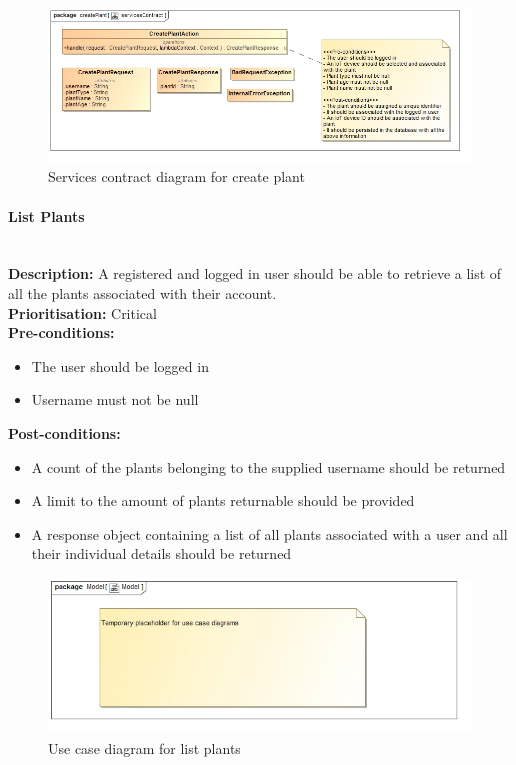 \documentclass{article}
\begin{document}
		\begin{figure}[H]
			\includegraphics[width=\linewidth]{images/ServicesContracts/createPlant.jpg}
			\caption{Services contract diagram for create plant}
		\end{figure}
		
	\paragraph{List Plants}\mbox{}\\
		\textbf{Description:} A registered and logged in user should be able to retrieve a list of all the plants associated with their account.\\
		\textbf{Prioritisation:} Critical\\		
		\textbf{Pre-conditions:}
			\begin{itemize}
				\item The user should be logged in
				\item Username must not be null
			\end{itemize}
		\textbf{Post-conditions:}
			\begin{itemize}
				\item A count of the plants belonging to the supplied username should be returned
				\item A limit to the amount of plants returnable should be provided
				\item A response object containing a list of all plants associated with a user and all their individual details should be returned
			\end{itemize}

		\begin{figure}[H]
			\includegraphics[width=\linewidth]{images/tempUseCase.jpg}
			\caption{Use case diagram for list plants}
		\end{figure}
		
\end{document}
